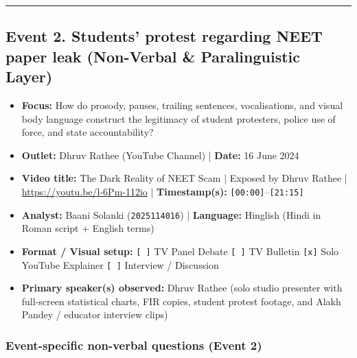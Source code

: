 \documentclass[10pt,a4paper]{article}
\begin{document}
\bigskip\hrule\bigskip

\subsection*{Event 2. Students' protest regarding NEET paper leak (Non-Verbal \& Paralinguistic Layer)}

\begin{itemize}
  \item \textbf{Focus:} How do prosody, pauses, trailing sentences, vocalisations, and visual body language construct the legitimacy of student protesters, police use of force, and state accountability?
  \item \textbf{Outlet:} Dhruv Rathee (YouTube Channel) | \textbf{Date:} 16 June 2024
  \item \textbf{Video title:} The Dark Reality of NEET Scam | Exposed by Dhruv Rathee | \href{https://youtu.be/l-6Pm-112io}{https://youtu.be/l-6Pm-112io} | \textbf{Timestamp(s):} \texttt{[00:00]}--\texttt{[21:15]}
  \item \textbf{Analyst:} Baani Solanki (\texttt{2025114016}) | \textbf{Language:} Hinglish (Hindi in Roman script + English terms)
  \item \textbf{Format / Visual setup:} \texttt{[ ]} TV Panel Debate \texttt{[ ]} TV Bulletin \texttt{[x]} Solo YouTube Explainer \texttt{[ ]} Interview / Discussion
  \item \textbf{Primary speaker(s) observed:} Dhruv Rathee (solo studio presenter with full-screen statistical charts, FIR copies, student protest footage, and Alakh Pandey / educator interview clips)
\end{itemize}

\subsubsection*{Event-specific non-verbal questions (Event 2)}
\end{document}
